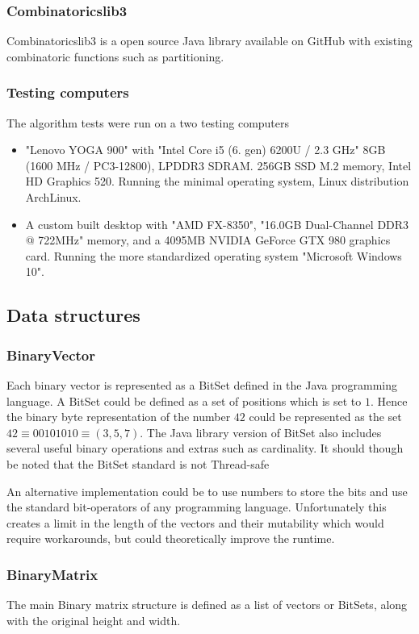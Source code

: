 \documentclass[a4paper]{article}
\begin{document}
\subsubsection{Combinatoricslib3}
Combinatoricslib3 is a open source Java library available on GitHub with existing
combinatoric functions such as partitioning.

\subsubsection{Testing computers}
\label{sec:computer}
The algorithm tests were run on a two testing computers
\begin{itemize}
    \item "Lenovo YOGA 900" with "Intel Core i5 (6. gen) 6200U / 2.3 GHz"
    8GB (1600 MHz / PC3-12800), LPDDR3 SDRAM. 256GB SSD M.2 memory, Intel HD Graphics 520.
    Running the minimal operating system, Linux distribution ArchLinux.
    \item A custom built desktop with "AMD FX-8350", "16.0GB Dual-Channel DDR3 @ 722MHz" memory, and a
    4095MB NVIDIA GeForce GTX 980 graphics card. Running the more standardized operating 
    system "Microsoft Windows 10".
\end{itemize}

\subsection{Data structures}
\subsubsection{BinaryVector}
Each binary vector is represented as a BitSet defined in the Java programming language. A
BitSet could be defined as a set of positions which is set to $1$. Hence the binary byte
representation of the number $42$ could be represented as the set
$42 \equiv 00101010 \equiv (3,5,7)$. The Java library version of BitSet also includes several
useful binary operations and extras such as cardinality. It should though be noted that the
BitSet standard is not Thread-safe \cite{bitset_java_14_2020}


An alternative implementation could be to use numbers to store the bits and use the standard
bit-operators of any programming language. Unfortunately this creates a limit in the length
of the vectors and their mutability which would require workarounds, but could theoretically
improve the runtime.

\subsubsection{BinaryMatrix}
The main Binary matrix structure is defined as a list of vectors or BitSets, along with the
original height and width.
\end{document}
